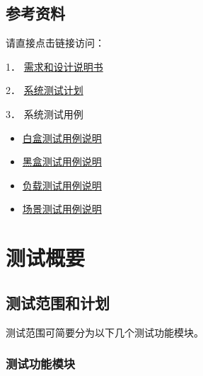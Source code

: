 \documentclass[hyperref, a4paper]{ctexart}
\begin{document}
\hypertarget{ux53c2ux8003ux8d44ux6599}{%
\subsection{参考资料}\label{ux53c2ux8003ux8d44ux6599}}

请直接点击链接访问：

1．
\href{https://github.com/StrayBird-ATSH/SoftwareQA-Testing/blob/master/requirements/\%E5\%87\%BA\%E9\%A2\%98\%E7\%B3\%BB\%E7\%BB\%9F\%E9\%9C\%80\%E6\%B1\%82\%E6\%96\%87\%E6\%A1\%A3-to\%E5\%AD\%A6\%E7\%94\%9F.pdf}{需求和设计说明书}

2．
\href{https://github.com/StrayBird-ATSH/SoftwareQA-Testing/blob/master/lab3/lab3.pdf}{系统测试计划}

3． 系统测试用例

\begin{itemize}
\item
  \href{https://github.com/StrayBird-ATSH/SoftwareQA-Testing/blob/master/lab4/lab4\%E5\%87\%BA\%E9\%A2\%98\%E8\%80\%83\%E8\%AF\%95\%E7\%B3\%BB\%E7\%BB\%9F\%E7\%99\%BD\%E7\%9B\%92\%E6\%B5\%8B\%E8\%AF\%95\%E6\%8A\%A5\%E5\%91\%8A.pdf}{白盒测试用例说明}
\item
  \href{https://github.com/StrayBird-ATSH/SoftwareQA-Testing/blob/master/lab5/lab5.pdf}{黑盒测试用例说明}
\item
  \href{https://github.com/StrayBird-ATSH/SoftwareQA-Testing/blob/master/lab6/lab6.pdf}{负载测试用例说明}
\item
  \href{https://github.com/StrayBird-ATSH/SoftwareQA-Testing/blob/master/lab8/lab8.md}{场景测试用例说明}
\end{itemize}

\hypertarget{ux6d4bux8bd5ux6982ux8981}{%
\section{测试概要}\label{ux6d4bux8bd5ux6982ux8981}}

\hypertarget{ux6d4bux8bd5ux8303ux56f4ux548cux8ba1ux5212}{%
\subsection{测试范围和计划}\label{ux6d4bux8bd5ux8303ux56f4ux548cux8ba1ux5212}}

测试范围可简要分为以下几个测试功能模块。

\hypertarget{ux6d4bux8bd5ux529fux80fdux6a21ux5757}{%
\subsubsection{测试功能模块}\label{ux6d4bux8bd5ux529fux80fdux6a21ux5757}}
\end{document}
